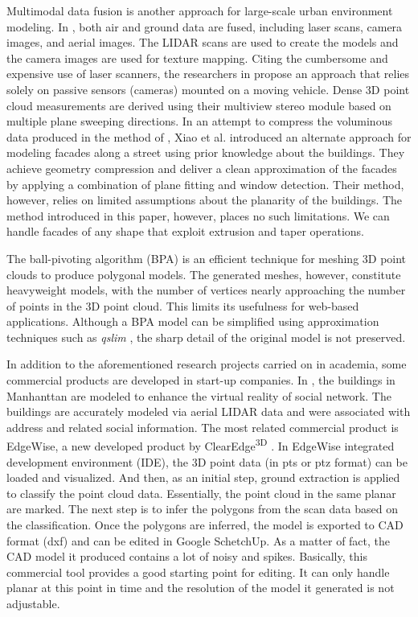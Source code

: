 Multimodal data fusion is another approach for large-scale urban
environment modeling.
In \cite{UM_Zakhor,UM_HYN}, both air and ground data are fused, including
laser scans, camera images, and aerial images.
The LIDAR scans are used to create the models and the camera images are used
for texture mapping.
Citing the cumbersome and expensive use of laser scanners, the researchers
in \cite{AKBARZADEH06} propose an approach that relies solely on passive
sensors (cameras) mounted on a moving vehicle.
Dense 3D point cloud measurements are derived using their multiview stereo
module based on multiple plane sweeping directions.
In an attempt to compress the voluminous data produced in the method of
\cite{AKBARZADEH06}, Xiao et al. \cite{UM_XFTQ} introduced an alternate
approach for modeling facades along a street using prior knowledge about
the buildings.
They achieve geometry compression and deliver a clean approximation of the
facades by applying a combination of plane fitting and window detection.
Their method, however, relies on limited assumptions about the planarity of
the buildings.
The method introduced in this paper, however, places no such limitations.
We can handle facades of any shape that exploit extrusion and taper operations.

The ball-pivoting algorithm (BPA) \cite{BPA_BMRS} is an efficient technique
for meshing 3D point clouds to produce polygonal models.
The generated meshes, however, constitute heavyweight models,
with the number of vertices nearly approaching the number of points in the
3D point cloud.
This limits its usefulness for web-based applications.
Although a BPA model can be simplified using approximation techniques such as
{\it qslim} \cite{BPA_GH}, the sharp detail of the original model is not
preserved.

In addition to the aforementioned research projects carried on in academia, 
some commercial products are developed in start-up companies. 
In \cite{IND_YC}, the buildings in Manhanttan are modeled to enhance
the virtual reality of social network. The buildings are accurately modeled via
aerial LIDAR data and were associated with address and related social information.
The most related commercial product is EdgeWise\textsuperscript{\texttrademark}, 
a new developed product by ClearEdge\textsuperscript{3D} \cite{IND_EW}.
In EdgeWise integrated development environment (IDE), the 3D point data 
(in pts or ptz format) can be loaded and visualized. And then, as an initial step,
ground extraction is applied to classify the point cloud data. 
Essentially, the point cloud in the same planar are marked. 
The next step is to infer the polygons from the scan data based on the classification. 
Once the polygons are inferred, the model is
exported to CAD format (dxf) and can be edited in Google SchetchUp. 
As a matter of fact, the CAD model it produced contains a lot of noisy and spikes. 
Basically, this commercial tool provides a good starting point for editing. 
It can only handle planar at this point in time and 
the resolution of the model it generated is not adjustable.


